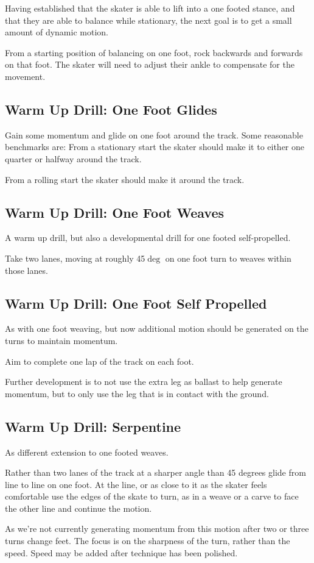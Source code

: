 Having established that the skater is able to lift into a one footed stance, and that they are able to balance while stationary, the next goal is to get a small amount of dynamic motion. 

From a starting position of balancing on one foot, rock backwards and forwards on that foot. 
The skater will need to adjust their ankle to compensate for the movement.


\subsection*{Warm Up Drill: One Foot Glides} 

Gain some momentum and glide on one foot around the track. 
Some reasonable benchmarks are: From a stationary start the skater should make it to either one quarter or halfway around the track. 

From a rolling start the skater should make it around the track.

\subsection*{Warm Up Drill: One Foot Weaves} 

A warm up drill, but also a developmental drill for one footed self-propelled.

Take two lanes, moving at roughly 45$\deg$ on one foot turn to weaves within those lanes.    

\subsection*{Warm Up Drill: One Foot Self Propelled} 

As with one foot weaving, but now additional motion should be generated on the turns to maintain momentum.  

Aim to complete one lap of the track on each foot.

Further development is to not use the extra leg as ballast to help generate momentum, but to only use the leg that is in contact with the ground. 

\subsection*{Warm Up Drill: Serpentine} 

As different extension to one footed weaves.

Rather than two lanes of the track at a sharper angle than 45 degrees glide from line to line on one foot. At the line, or as close to it as the skater feels comfortable use the edges of the skate to turn, as in a weave or a carve to face the other line and continue the motion.   

As we're not currently generating momentum from this motion after two or three turns change feet. 
The focus is on the sharpness of the turn, rather than the speed. 
Speed may be added after technique has been polished.

